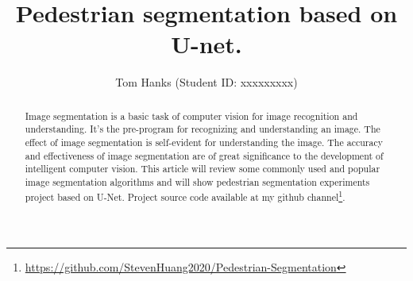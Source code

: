 \documentclass[12pt, a4paper]{article}
\title{Pedestrian segmentation based on U-net.}
\date{}
\author{Tom Hanks (Student ID: xxxxxxxxx)}
\begin{document}
	\maketitle
	\newpage

	\begin{abstract} \justify %
Image segmentation is a basic task of computer vision for image recognition and understanding. It’s the pre-program for recognizing and understanding an image. The effect of image segmentation is self-evident for understanding the image. The accuracy and effectiveness of image segmentation are of great significance to the development of intelligent computer vision. This article will review some commonly used and popular image segmentation algorithms and will show pedestrian segmentation experiments project based on U-Net. Project source code available at my github channel\footnote{\label{}\url{https://github.com/StevenHuang2020/Pedestrian-Segmentation}}.
	\end{abstract}

	\setlength{\lineskip}{3em}     %
	\setlength{\parskip}{0.5em}     %
\end{document}
